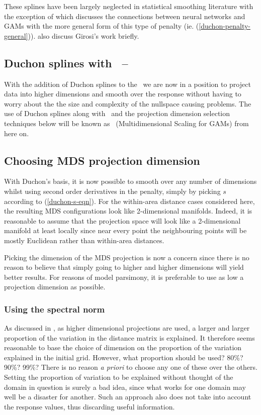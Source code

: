 These splines have been largely neglected in statistical smoothing literature with the exception of \cite{girosi} which discusses the connections between neural networks and GAMs with the more general form of this type of penalty (ie. (\ref{duchon-penalty-general})). \cite[p. 168]{elements} also discuss Girosi's work briefly.

\subsection{Duchon splines with \mdsap\ -- \mdsds}

With the addition of Duchon splines to the \mdsap\ we are now in a position to project data into higher dimensions and smooth over the response without having to worry about the the size and complexity of the nullspace causing problems. The use of Duchon splines along with \mdsap\ and the projection dimension selection techniques below will be known as \mdsds\ (Multidimensional Scaling for GAMs) from here on.

\subsection{Choosing MDS projection dimension}

With Duchon's basis, it is now possible to smooth over any number of dimensions whilst using second order derivatives in the penalty, simply by picking $s$ according to (\ref{duchon-s-eqn}). For the within-area distance cases considered here, the resulting MDS configurations look like 2-dimensional manifolds. Indeed, it is reasonable to assume that the projection space will look like a 2-dimensional manifold at least locally since near every point the neighbouring points will be mostly Euclidean rather than within-area distances. 

Picking the dimension of the MDS projection is now a concern since there is no reason to believe that simply going to higher and higher dimensions will yield better results. For reasons of model parsimony, it is preferable to use as low a projection dimension as possible.

\subsubsection{Using the spectral norm}

As discussed in , as higher dimensional projections are used, a larger and larger proportion of the variation in the distance matrix is explained. It therefore seems reasonable to base the choice of dimension on the proportion of the variation explained in the initial grid. However, what proportion should be used? 80\%? 90\%? 99\%? There is no reason \textit{a priori} to choose any one of these over the others. Setting the proportion of variation to be explained without thought of the domain in question is surely a bad idea, since what works for one domain may well be a disaster for another. Such an approach also does not take into account the response values, thus discarding useful information.

